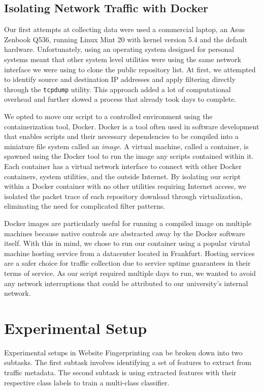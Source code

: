 \documentclass[sigconf,authorversion,nonacm]{acmart}
\begin{document}
 
\subsection{Isolating Network Traffic with Docker}
Our first attempts at collecting data were used a commercial laptop, an Asus Zenbook Q536, running Linux Mint 20 with kernel version 5.4 and the default hardware. Unfortunately, using an operating system designed for personal systems meant that other system level utilities were using the same network interface we were using to clone the public repository list. At first, we attempted to identify source and destination IP addresses and apply filtering directly through the \texttt{tcpdump} utility. This approach added a lot of computational overhead and further slowed a process that already took days to complete.

We opted to move our script to a controlled environment using the containerization tool, Docker. Docker is a tool often used in software development that enables scripts and their necessary dependencies to be compiled into a miniature file system called an \textit{image}. A virtual machine, called a container, is spawned using the Docker tool to run the image any scripts contained within it. Each container has a virtual network interface to connect with other Docker containers, system utilities, and the outside Internet. By isolating our script within a Docker container with no other utilities requiring Internet access, we isolated the packet trace of each repository download through virtualization, eliminating the need for complicated filter patterns.

Docker images are particularly useful for running a compiled image on multiple machines because native controls are abstracted away by the Docker software itself. With this in mind, we chose to run our container using a popular virutal machine hosting service from a datacenter located in Frankfurt. Hosting services are a safer choice for traffic collection due to service uptime guarantees in their terms of service. As our script required multiple days to run, we wanted to avoid any network interruptions that could be attributed to our university's internal network.

\section{Experimental Setup}
Experimental setups in Website Fingerprinting can be broken down into two subtasks. The first subtask involves identifying a set of features to extract from traffic metadata. The second subtask is using extracted features with their respective class labels to train a multi-class classifier.
\end{document}
